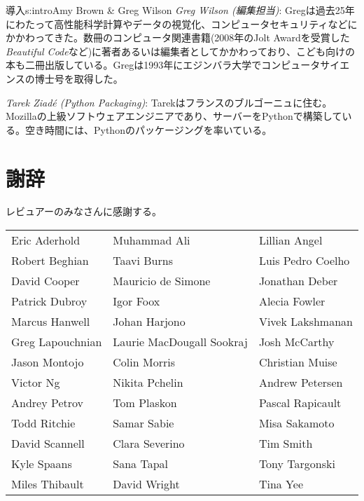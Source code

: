 \begin{aosachapter}{導入}{s:intro}{Amy Brown \& Greg Wilson}
\emph{Greg Wilson (編集担当)}: Gregは過去25年にわたって高性能科学計算やデータの視覚化、コンピュータセキュリティなどにかかわってきた。数冊のコンピュータ関連書籍(2008年のJolt Awardを受賞した\emph{Beautiful Code}など)に著者あるいは編集者としてかかわっており、こども向けの本も二冊出版している。Gregは1993年にエジンバラ大学でコンピュータサイエンスの博士号を取得した。

\emph{Tarek Ziad\'{e} (Python Packaging)}: Tarekはフランスのブルゴーニュに住む。Mozillaの上級ソフトウェアエンジニアであり、サーバーをPythonで構築している。空き時間には、Pythonのパッケージングを率いている。

\section*{謝辞}

レビュアーのみなさんに感謝する。\\

\begin{tabular}{lll}
Eric Aderhold		& Muhammad Ali			& Lillian Angel		\\
Robert Beghian		& Taavi Burns			& Luis Pedro Coelho	\\
David Cooper		& Mauricio de Simone		& Jonathan Deber	\\
Patrick Dubroy		& Igor Foox			& Alecia Fowler		\\
Marcus Hanwell		& Johan Harjono			& Vivek Lakshmanan	\\
Greg Lapouchnian	& Laurie MacDougall Sookraj	& Josh McCarthy		\\
Jason Montojo		& Colin Morris			& Christian Muise	\\
Victor Ng		& Nikita Pchelin		& Andrew Petersen	\\
Andrey Petrov		& Tom Plaskon			& Pascal Rapicault	\\
Todd Ritchie		& Samar Sabie			& Misa Sakamoto		\\
David Scannell		& Clara Severino		& Tim Smith		\\
Kyle Spaans		& Sana Tapal			& Tony Targonski	\\
Miles Thibault		& David Wright			& Tina Yee
\end{tabular}


\end{aosachapter}
